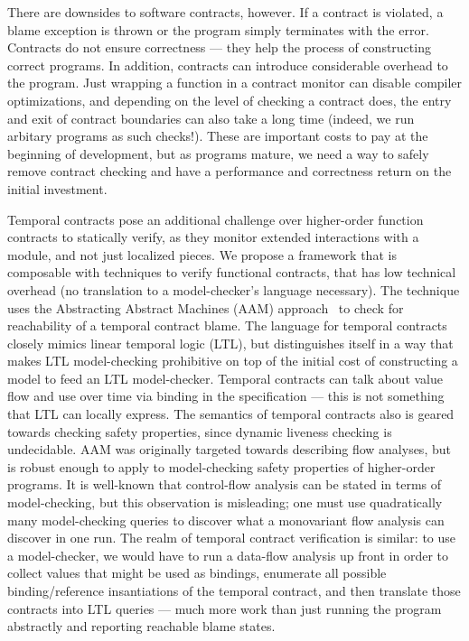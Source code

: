 \documentclass[preprint,onecolumn,9pt]{sigplanconf} %
\begin{document}
There are downsides to software contracts, however.
%
If a contract is violated, a blame exception is thrown or the program simply terminates with the error.
%
Contracts do not ensure correctness --- they help the process of constructing correct programs.
%
In addition, contracts can introduce considerable overhead to the program.
%
Just wrapping a function in a contract monitor can disable compiler optimizations, and depending on the level of checking a contract does, the entry and exit of contract boundaries can also take a long time (indeed, we run arbitary programs as such checks!).
%
These are important costs to pay at the beginning of development, but as programs mature, we need a way to safely remove contract checking and have a performance and correctness return on the initial investment.

Temporal contracts pose an additional challenge over higher-order function contracts to statically verify, as they monitor extended interactions with a module, and not just localized pieces.
%
We propose a framework that is composable with techniques to verify functional contracts, that has low technical overhead (no translation to a model-checker's language necessary).
%
The technique uses the Abstracting Abstract Machines (AAM) approach~\citet{dvanhorn:VanHorn2010Abstracting} to check for reachability of a temporal contract blame.
%
The language for temporal contracts closely mimics linear temporal logic (LTL), but distinguishes itself in a way that makes LTL model-checking prohibitive on top of the initial cost of constructing a model to feed an LTL model-checker.
%
Temporal contracts can talk about value flow and use over time via binding in the specification --- this is not something that LTL can locally express.
%
The semantics of temporal contracts also is geared towards checking safety properties, since dynamic liveness checking is undecidable.
%
AAM was originally targeted towards describing flow analyses, but is robust enough to apply to model-checking safety properties of higher-order programs.
%
It is well-known that control-flow analysis can be stated in terms of model-checking, but this observation is misleading; one must use quadratically many model-checking queries to discover what a monovariant flow analysis can discover in one run.
%
The realm of temporal contract verification is similar: to use a model-checker, we would have to run a data-flow analysis up front in order to collect values that might be used as bindings, enumerate all possible binding/reference insantiations of the temporal contract, and then translate those contracts into LTL queries --- much more work than just running the program abstractly and reporting reachable blame states.
%
\end{document}
